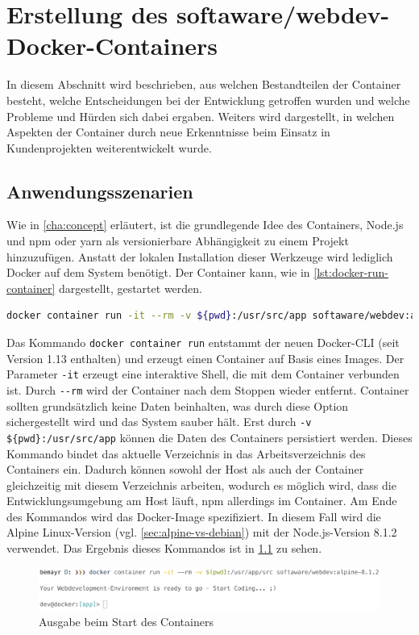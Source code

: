 \chapter{Erstellung des softaware/webdev-\\Docker-Containers}
\label{cha:implementation}
In diesem Abschnitt wird beschrieben, aus welchen Bestandteilen der Container besteht, welche Entscheidungen bei der Entwicklung getroffen wurden und welche Probleme und Hürden sich dabei ergaben.
Weiters wird dargestellt, in welchen Aspekten der Container durch neue Erkenntnisse beim Einsatz in Kundenprojekten weiterentwickelt wurde.

\section{Anwendungsszenarien}
\label{sec:usage}
Wie in \cref{cha:concept} erläutert, ist die grundlegende Idee des Containers, Node.js und npm oder yarn als versionierbare Abhängigkeit zu einem Projekt hinzuzufügen.
Anstatt der lokalen Installation dieser Werkzeuge wird lediglich Docker auf dem System benötigt.
Der Container kann, wie in \cref{lst:docker-run-container} dargestellt, gestartet werden.
\begin{lstlisting}[caption=Kommando zum Starten des softaware/webdev-Containers, language=bash, label=lst:docker-run-container]
docker container run -it --rm -v ${pwd}:/usr/src/app softaware/webdev:alpine-8.1.2
\end{lstlisting}
Das Kommando \verb|docker container run| entstammt der neuen Docker-CLI (seit Version 1.13 enthalten) und erzeugt einen Container auf Basis eines Images.
Der Parameter \verb|-it| erzeugt eine interaktive Shell, die mit dem Container verbunden ist.
Durch \verb|--rm| wird der Container nach dem Stoppen wieder entfernt.
Container sollten grundsätzlich keine Daten beinhalten, was durch diese Option sichergestellt wird und das System sauber hält.
Erst durch \verb|-v ${pwd}:/usr/src/app| können die Daten des Containers persistiert werden.
Dieses Kommando bindet das aktuelle Verzeichnis in das Arbeitsverzeichnis des Containers ein.
Dadurch können sowohl der Host als auch der Container gleichzeitig mit diesem Verzeichnis arbeiten, wodurch es möglich wird, dass die Entwicklungsumgebung am Host läuft, npm allerdings im Container.
Am Ende des Kommandos wird das Docker-Image spezifiziert.
In diesem Fall wird die Alpine Linux-Version (vgl. \cref{sec:alpine-vs-debian}) mit der Node.js-Version 8.1.2 verwendet.
Das Ergebnis dieses Kommandos ist in \cref{fig:container-execution} zu sehen.
\begin{figure}[htbp]
    \centering
    \includegraphics[width=0.95\linewidth,clip]{images/container-execution}
    \caption{Ausgabe beim Start des Containers}
\label{fig:container-execution}
\end{figure}

